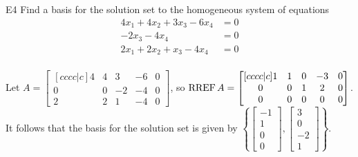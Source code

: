 \documentclass{sbgLAquiz}
\begin{document}
\begin{extract}\newpage\end{extract}
\begin{problem}{E4}
Find a basis for the solution set to the homogeneous system of equations
\begin{align*}
4x_1+4x_2+3x_3-6x_4 &= 0 \\
-2x_3-4x_4 &= 0 \\
2x_1+2x_2+x_3-4x_4 &= 0 \\
\end{align*}
\end{problem}
\begin{solution}
Let \(A =
  \begin{bmatrix}[cccc|c]
    4 & 4 & 3 & -6 & 0 \\
    0 & 0 & -2 & -4 & 0 \\
    2 & 2 & 1 & -4 & 0
  \end{bmatrix}
\), so \(\operatorname{RREF} A =
  \begin{bmatrix}[cccc|c]
    1 & 1 & 0 & -3 & 0 \\
    0 & 0 & 1 & 2 & 0 \\
    0 & 0 & 0 & 0 & 0
  \end{bmatrix}
\).
It follows that the basis for the solution set is given by \(\left\{
  \begin{bmatrix}
    -1 \\
    1 \\
    0 \\
    0
  \end{bmatrix},
  \begin{bmatrix}
    3 \\
    0 \\
    -2 \\
    1
  \end{bmatrix}
\right\}\).
\end{solution}
\end{document}
